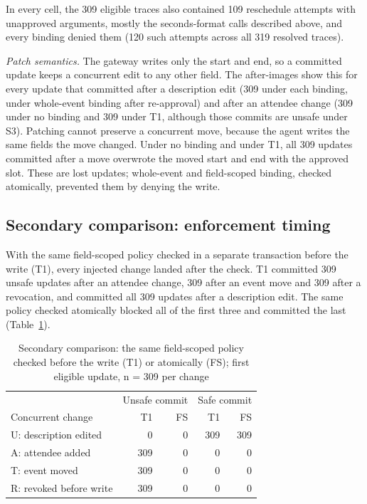 In every cell, the 309 eligible traces also contained 109 reschedule attempts with unapproved arguments, mostly the seconds-format calls described above, and every binding denied them (120 such attempts across all 319 resolved traces).

\textit{Patch semantics.} The gateway writes only the start and end, so a committed update keeps a concurrent edit to any other field. The after-images show this for every update that committed after a description edit (309 under each binding, under whole-event binding after re-approval) and after an attendee change (309 under no binding and 309 under T1, although those commits are unsafe under S3). Patching cannot preserve a concurrent move, because the agent writes the same fields the move changed. Under no binding and under T1, all 309 updates committed after a move overwrote the moved start and end with the approved slot. These are lost updates; whole-event and field-scoped binding, checked atomically, prevented them by denying the write.

\subsection{Secondary comparison: enforcement timing}
With the same field-scoped policy checked in a separate transaction before the write (T1), every injected change landed after the check. T1 committed 309 unsafe updates after an attendee change, 309 after an event move and 309 after a revocation, and committed all 309 updates after a description edit. The same policy checked atomically blocked all of the first three and committed the last (Table~\ref{tab:timing}).

\begin{table}[t]
\caption{Secondary comparison: the same field-scoped policy checked before the write (T1) or atomically (FS); first eligible update, n = 309 per change}
\label{tab:timing}
\centering
\footnotesize
\begin{tabular}{lrrrr}
\toprule
 & \multicolumn{2}{c}{Unsafe commit} & \multicolumn{2}{c}{Safe commit} \\
Concurrent change & T1 & FS & T1 & FS \\
\midrule
U: description edited & 0 & 0 & 309 & 309 \\
A: attendee added & 309 & 0 & 0 & 0 \\
T: event moved & 309 & 0 & 0 & 0 \\
R: revoked before write & 309 & 0 & 0 & 0 \\
\bottomrule
\end{tabular}
\end{table}

